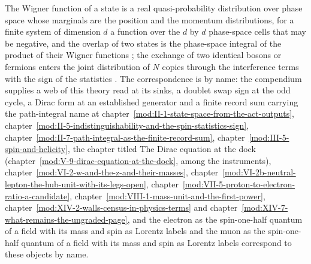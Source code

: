 \begin{chbridge}
The Wigner function of a state is a real quasi-probability distribution over phase space whose marginals are the position and the momentum distributions, for a finite system of dimension $d$ a function over the $d$ by $d$ phase-space cells that may be negative, and the overlap of two states is the phase-space integral of the product of their Wigner functions \cite{Wigner1932}; the exchange of two identical bosons or fermions enters the joint distribution of $N$ copies through the interference terms with the sign of the statistics \cite{Pauli1940}. The correspondence is by name: the compendium supplies a web of this theory read at its sinks, a doublet swap sign at the odd cycle, a Dirac form at an established generator and a finite record sum carrying the path-integral name at chapter~\ref{mod:II-1-state-space-from-the-act-outputs}, chapter~\ref{mod:II-5-indistinguishability-and-the-spin-statistics-sign}, chapter~\ref{mod:II-7-path-integral-as-the-finite-record-sum}, chapter~\ref{mod:III-5-spin-and-helicity}, the chapter titled The Dirac equation at the dock (chapter~\ref{mod:V-9-dirac-equation-at-the-dock}, among the instruments), chapter~\ref{mod:VI-2-w-and-the-z-and-their-masses}, chapter~\ref{mod:VI-2b-neutral-lepton-the-hub-unit-with-its-legs-open}, chapter~\ref{mod:VII-5-proton-to-electron-ratio-a-candidate}, chapter~\ref{mod:VIII-1-mass-unit-and-the-first-power}, chapter~\ref{mod:XIV-2-walls-census-in-physics-terms} and chapter~\ref{mod:XIV-7-what-remains-the-ungraded-page}, and the electron as the spin-one-half quantum of a field with its mass and spin as Lorentz labels and the muon as the spin-one-half quantum of a field with its mass and spin as Lorentz labels correspond to these objects by name.
\end{chbridge}
